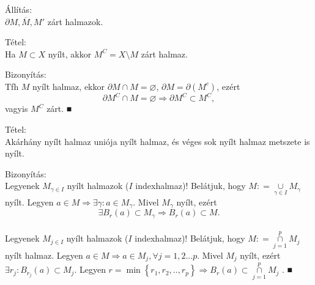 \documentclass[]{scrartcl}
\newenvironment{tetel}{}{}
\newenvironment{bizonyitas}{}{}
\newenvironment{allitas}{}{}
\begin{document}
\begin{allitas}

Állítás:\\
\(\partial M,\overline{M},M'\) zárt halmazok.

\end{allitas}

\begin{tetel}

Tétel:\\
Ha \(M \subset X\) nyílt, akkor \(M^{C} = X\text{\textbackslash}M\) zárt
halmaz.

\end{tetel}

\begin{bizonyitas}

Bizonyítás:\\
Tfh \(M\) nyílt halmaz, ekkor \(\partial M \cap M = \varnothing\),
\(\partial M = \partial\left( M^{c} \right)\), ezért
\[\left. \partial M^{C} \cap M = \varnothing\Rightarrow\partial M^{C} \subset M^{C} \right.,\]
vagyis \(M^{C}\) zárt. ■

\end{bizonyitas}

\begin{tetel}

Tétel:\\
Akárhány nyílt halmaz uniója nyílt halmaz, és véges sok nyílt halmaz
metszete is nyílt.

\end{tetel}

\begin{bizonyitas}

Bizonyítás:\\
Legyenek \(M_{\gamma \in I}\) nyílt halmazok (\(I\) indexhalmaz)!
Belátjuk, hogy \(M: = {\underset{\gamma \in I}{\cup}M_{\gamma}}\) nyílt.
Legyen
\(\left. a \in M\Rightarrow\exists\gamma:a \in M_{\gamma} \right.\).
Mivel \(M_{\gamma}\) nyílt, ezért
\[\left. \exists B_{r}\left( a \right) \subset M_{\gamma}\Rightarrow B_{r}\left( a \right) \subset M \right..\]\\
Legyenek \(M_{j \in I}\) nyílt halmazok (\(I\) indexhalmaz)! Belátjuk,
hogy \(M: = {\underset{j = 1}{\overset{p}{\cap}}M_{j}}\) nyílt halmaz.
Legyen
\(\left. a \in M\Rightarrow a \in M_{j},\forall j = 1,2...p \right.\).
Mivel \(M_{j}\) nyílt, ezért
\(\exists r_{j}:B_{r_{j}}\left( a \right) \subset M_{j}\). Legyen
\(\left. r = \min\left\{ {r_{1},r_{2},..,r_{p}} \right\}\Rightarrow B_{r}\left( a \right) \subset {\underset{j = 1}{\overset{p}{\cap}}M_{j}} \right.\)
. ■

\end{bizonyitas}
\end{document}
